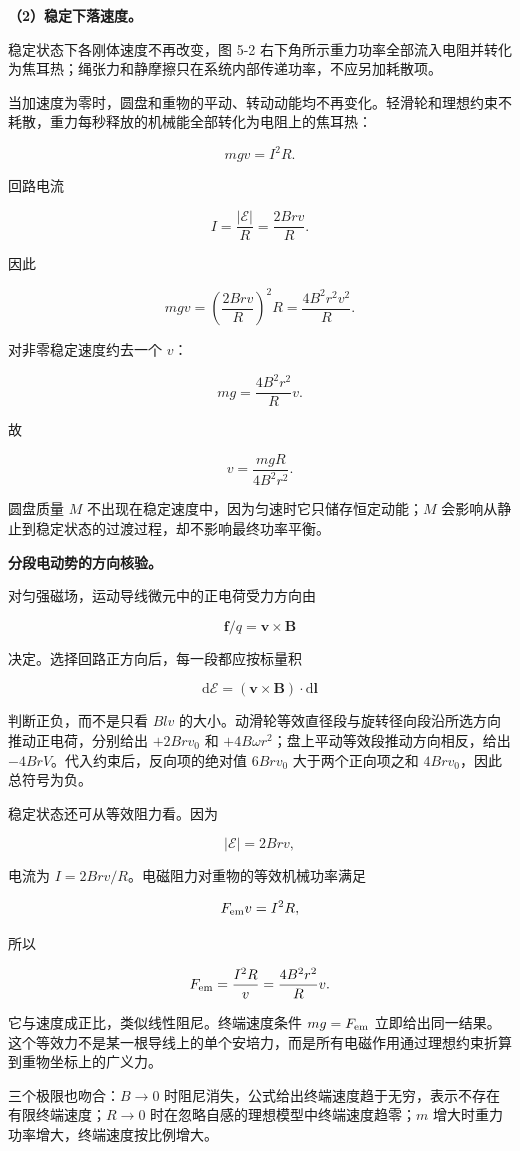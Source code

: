 \documentclass[12pt,a4paper,UTF8]{ctexart}
\begin{document}
\textbf{（2）稳定下落速度。}

稳定状态下各刚体速度不再改变，图 5-2
右下角所示重力功率全部流入电阻并转化为焦耳热；绳张力和静摩擦只在系统内部传递功率，不应另加耗散项。

当加速度为零时，圆盘和重物的平动、转动动能均不再变化。轻滑轮和理想约束不耗散，重力每秒释放的机械能全部转化为电阻上的焦耳热：

\[mgv=I^2R.\]

回路电流

\[I=\frac{|\mathcal E|}{R}=\frac{2Brv}{R}.\]

因此

\[mgv=\left(\frac{2Brv}{R}\right)^2R
=\frac{4B^2r^2v^2}{R}.\]

对非零稳定速度约去一个 \(v\)：

\[mg=\frac{4B^2r^2}{R}v.\]

故

\[\boxed{v=\frac{mgR}{4B^2r^2}}.\]

圆盘质量 \(M\) 不出现在稳定速度中，因为匀速时它只储存恒定动能；\(M\)
会影响从静止到稳定状态的过渡过程，却不影响最终功率平衡。

\textbf{分段电动势的方向核验。}

对匀强磁场，运动导线微元中的正电荷受力方向由

\[\bm f/q=\bm v\times\bm B\]

决定。选择回路正方向后，每一段都应按标量积

\[\mathrm d\mathcal E=(\bm v\times\bm B)\cdot\mathrm d\bm l\]

判断正负，而不是只看 \(Blv\)
的大小。动滑轮等效直径段与旋转径向段沿所选方向推动正电荷，分别给出
\(+2Brv_0\) 和 \(+4B\omega r^2\)；盘上平动等效段推动方向相反，给出
\(-4BrV\)。代入约束后，反向项的绝对值 \(6Brv_0\) 大于两个正向项之和
\(4Brv_0\)，因此总符号为负。

稳定状态还可从等效阻力看。因为

\[|\mathcal E|=2Brv,\]

电流为 \(I=2Brv/R\)。电磁阻力对重物的等效机械功率满足

\[F_{\rm em}v=I^2R,\]

所以

\[F_{\rm em}=\frac{I^2R}{v}=\frac{4B^2r^2}{R}v.\]

它与速度成正比，类似线性阻尼。终端速度条件 \(mg=F_{\rm em}\)
立即给出同一结果。这个等效力不是某一根导线上的单个安培力，而是所有电磁作用通过理想约束折算到重物坐标上的广义力。

三个极限也吻合：\(B\to0\)
时阻尼消失，公式给出终端速度趋于无穷，表示不存在有限终端速度；\(R\to0\)
时在忽略自感的理想模型中终端速度趋零；\(m\)
增大时重力功率增大，终端速度按比例增大。
\end{document}
